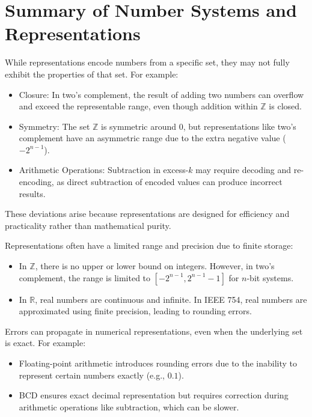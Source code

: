 \chapter{Summary of Number Systems and Representations}
While representations encode numbers from a specific set, they may not fully exhibit the properties of that set. For example:

\begin{itemize}
    \item Closure: In two's complement, the result of adding two numbers can overflow and exceed the representable range, even though addition within \( \mathbb{Z} \) is closed.
    \item Symmetry: The set \( \mathbb{Z} \) is symmetric around \( 0 \), but representations like two's complement have an asymmetric range due to the extra negative value (\( -2^{n-1} \)).
    \item Arithmetic Operations: Subtraction in excess-\( k \) may require decoding and re-encoding, as direct subtraction of encoded values can produce incorrect results.
\end{itemize}

These deviations arise because representations are designed for efficiency and practicality rather than mathematical purity.

Representations often have a limited range and precision due to finite storage:
\begin{itemize}
    \item In \( \mathbb{Z} \), there is no upper or lower bound on integers. However, in two's complement, the range is limited to \( [-2^{n-1}, 2^{n-1} - 1] \) for \( n \)-bit systems.
    \item In \( \mathbb{R} \), real numbers are continuous and infinite. In IEEE 754, real numbers are approximated using finite precision, leading to rounding errors.
\end{itemize}

Errors can propagate in numerical representations, even when the underlying set is exact. For example:
\begin{itemize}
    \item Floating-point arithmetic introduces rounding errors due to the inability to represent certain numbers exactly (e.g., \( 0.1 \)).
    \item BCD ensures exact decimal representation but requires correction during arithmetic operations like subtraction, which can be slower.
\end{itemize}

